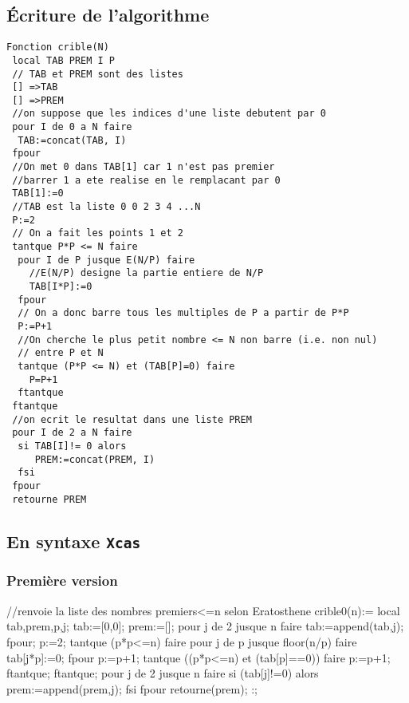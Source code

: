 \documentclass[12pt,a4paper]{book}
\begin{document}
\begin{giacjshere}
\subsection{\'Ecriture de l'algorithme}
\begin{verbatim}
Fonction crible(N)
 local TAB PREM I P
 // TAB et PREM sont des listes
 [] =>TAB
 [] =>PREM
 //on suppose que les indices d'une liste debutent par 0
 pour I de 0 a N faire 
  TAB:=concat(TAB, I)
 fpour
 //On met 0 dans TAB[1] car 1 n'est pas premier
 //barrer 1 a ete realise en le remplacant par 0
 TAB[1]:=0
 //TAB est la liste 0 0 2 3 4 ...N 
 P:=2
 // On a fait les points 1 et 2
 tantque P*P <= N faire
  pour I de P jusque E(N/P) faire
    //E(N/P) designe la partie entiere de N/P
    TAB[I*P]:=0
  fpour
  // On a donc barre tous les multiples de P a partir de P*P
  P:=P+1
  //On cherche le plus petit nombre <= N non barre (i.e. non nul)
  // entre P et N
  tantque (P*P <= N) et (TAB[P]=0) faire
    P=P+1
  ftantque
 ftantque
 //on ecrit le resultat dans une liste PREM
 pour I de 2 a N faire
  si TAB[I]!= 0 alors 
     PREM:=concat(PREM, I)
  fsi
 fpour
 retourne PREM
\end{verbatim}

\subsection{En syntaxe {\tt Xcas}}
\subsubsection{Premi\`ere version}
\begin{giaconload}
//renvoie la liste des nombres premiers<=n selon Eratosthene
crible0(n):={
  local tab,prem,p,j;
  tab:=[0,0];
  prem:=[];
  pour j de 2 jusque n faire
    tab:=append(tab,j);
  fpour;
  p:=2;
  tantque (p*p<=n) faire
    pour j de p jusque floor(n/p) faire
      tab[j*p]:=0;
    fpour
    p:=p+1;
    tantque ((p*p<=n) et (tab[p]==0)) faire
      p:=p+1;
    ftantque;
  ftantque;
  pour j de 2 jusque n faire
    si (tab[j]!=0) alors 
      prem:=append(prem,j);
    fsi
  fpour
  retourne(prem);
}:;
\end{giaconload}
\\

\end{giacjshere}
\end{document}
